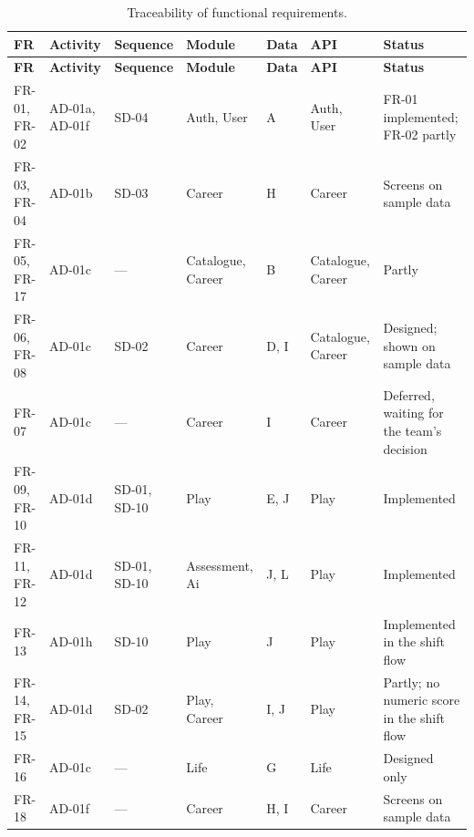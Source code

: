 {\footnotesize{}\renewcommand{\arraystretch}{1.1}
\begin{longtable}{|>{\raggedright\arraybackslash}p{}|>{\raggedright\arraybackslash}p{}|>{\raggedright\arraybackslash}p{}|>{\raggedright\arraybackslash}p{}|>{\raggedright\arraybackslash}p{}|>{\raggedright\arraybackslash}p{}|>{\raggedright\arraybackslash}p{}|}
\caption{Traceability of functional requirements.} \\
\hline
\textbf{FR} & \textbf{Activity} & \textbf{Sequence} & \textbf{Module} & \textbf{Data} & \textbf{API} & \textbf{Status} \\ \hline
\endfirsthead
\hline
\textbf{FR} & \textbf{Activity} & \textbf{Sequence} & \textbf{Module} & \textbf{Data} & \textbf{API} & \textbf{Status} \\ \hline
\endhead
FR-01, FR-02 & AD-01a, AD-01f & SD-04 & Auth, User & A & Auth, User & FR-01 implemented; FR-02 partly \\ \hline
FR-03, FR-04 & AD-01b & SD-03 & Career & H & Career & Screens on sample data \\ \hline
FR-05, FR-17 & AD-01c & --- & Catalogue, Career & B & Catalogue, Career & Partly \\ \hline
FR-06, FR-08 & AD-01c & SD-02 & Career & D, I & Catalogue, Career & Designed; shown on sample data \\ \hline
FR-07 & AD-01c & --- & Career & I & Career & Deferred, waiting for the team's decision \\ \hline
FR-09, FR-10 & AD-01d & SD-01, SD-10 & Play & E, J & Play & Implemented \\ \hline
FR-11, FR-12 & AD-01d & SD-01, SD-10 & Assessment, Ai & J, L & Play & Implemented \\ \hline
FR-13 & AD-01h & SD-10 & Play & J & Play & Implemented in the shift flow \\ \hline
FR-14, FR-15 & AD-01d & SD-02 & Play, Career & I, J & Play & Partly; no numeric score in the shift flow \\ \hline
FR-16 & AD-01c & --- & Life & G & Life & Designed only \\ \hline
FR-18 & AD-01f & --- & Career & H, I & Career & Screens on sample data \\ \hline

\end{longtable}}
